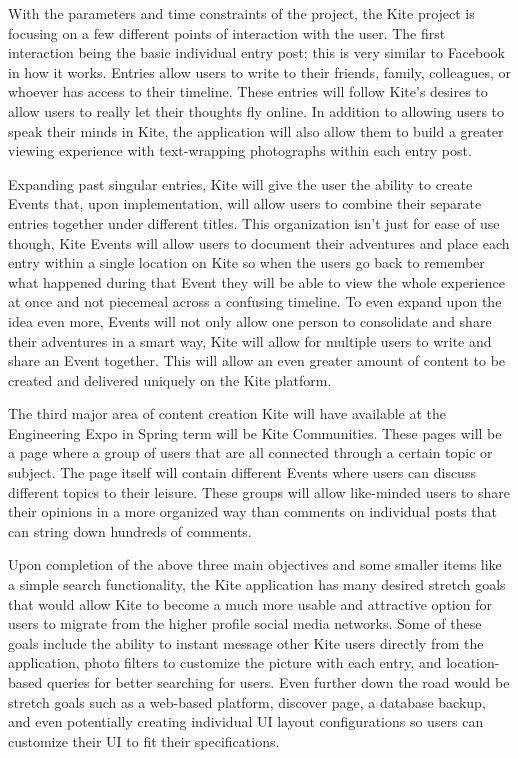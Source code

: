\documentclass[compsoc, 10, draftclsnofoot, onecolumn]{IEEEtran}
\begin{document}
With the parameters and time constraints of the project, the Kite project is focusing on a few different points of interaction with the user. The first interaction being the basic individual entry post; this is very similar to Facebook in how it works. Entries allow users to write to their friends, family, colleagues, or whoever has access to their timeline. These entries will follow Kite's desires to allow users to really let their thoughts fly online. In addition to allowing users to speak their minds in Kite, the application will also allow them to build a greater viewing experience with text-wrapping photographs within each entry post. 

Expanding past singular entries, Kite will give the user the ability to create Events that, upon implementation, will allow users to combine their separate entries together under different titles. This organization isn't just for ease of use though, Kite Events will allow users to document their adventures and place each entry within a single location on Kite so when the users go back to remember what happened during that Event they will be able to view the whole experience at once and not piecemeal across a confusing timeline. To even expand upon the idea even more, Events will not only allow one person to consolidate and share their adventures in a smart way, Kite will allow for multiple users to write and share an Event together. This will allow an even greater amount of content to be created and delivered uniquely on the Kite platform.

The third major area of content creation Kite will have available at the Engineering Expo in Spring term will be Kite Communities. These pages will be a page where a group of users that are all connected through a certain topic or subject. The page itself will contain different Events where users can discuss different topics to their leisure. These groups will allow like-minded users to share their opinions in a more organized way than comments on individual posts that can string down hundreds of comments.

Upon completion of the above three main objectives and some smaller items like a simple search functionality, the Kite application has many desired stretch goals that would allow Kite to become a much more usable and attractive option for users to migrate from the higher profile social media networks. Some of these goals include the ability to instant message other Kite users directly from the application, photo filters to customize the picture with each entry, and location-based queries for better searching for users. Even further down the road would be stretch goals such as a web-based platform, discover page, a database backup, and even potentially creating individual UI layout configurations so users can customize their UI to fit their specifications.
\end{document}
